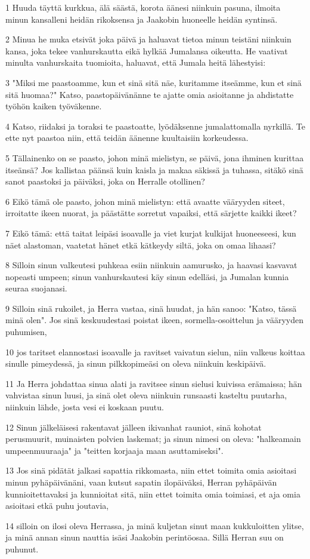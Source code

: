 \par 1 Huuda täyttä kurkkua, älä säästä, korota äänesi niinkuin pasuna, ilmoita minun kansalleni heidän rikoksensa ja Jaakobin huoneelle heidän syntinsä.
\par 2 Minua he muka etsivät joka päivä ja haluavat tietoa minun teistäni niinkuin kansa, joka tekee vanhurskautta eikä hylkää Jumalansa oikeutta. He vaativat minulta vanhurskaita tuomioita, haluavat, että Jumala heitä lähestyisi:
\par 3 "Miksi me paastoamme, kun et sinä sitä näe, kuritamme itseämme, kun et sinä sitä huomaa?" Katso, paastopäivänänne te ajatte omia asioitanne ja ahdistatte työhön kaiken työväkenne.
\par 4 Katso, riidaksi ja toraksi te paastoatte, lyödäksenne jumalattomalla nyrkillä. Te ette nyt paastoa niin, että teidän äänenne kuultaisiin korkeudessa.
\par 5 Tällainenko on se paasto, johon minä mielistyn, se päivä, jona ihminen kurittaa itseänsä? Jos kallistaa päänsä kuin kaisla ja makaa säkissä ja tuhassa, sitäkö sinä sanot paastoksi ja päiväksi, joka on Herralle otollinen?
\par 6 Eikö tämä ole paasto, johon minä mielistyn: että avaatte vääryyden siteet, irroitatte ikeen nuorat, ja päästätte sorretut vapaiksi, että särjette kaikki ikeet?
\par 7 Eikö tämä: että taitat leipäsi isoavalle ja viet kurjat kulkijat huoneeseesi, kun näet alastoman, vaatetat hänet etkä kätkeydy siltä, joka on omaa lihaasi?
\par 8 Silloin sinun valkeutesi puhkeaa esiin niinkuin aamurusko, ja haavasi kasvavat nopeasti umpeen; sinun vanhurskautesi käy sinun edelläsi, ja Jumalan kunnia seuraa suojanasi.
\par 9 Silloin sinä rukoilet, ja Herra vastaa, sinä huudat, ja hän sanoo: "Katso, tässä minä olen". Jos sinä keskuudestasi poistat ikeen, sormella-osoittelun ja vääryyden puhumisen,
\par 10 jos taritset elannostasi isoavalle ja ravitset vaivatun sielun, niin valkeus koittaa sinulle pimeydessä, ja sinun pilkkopimeäsi on oleva niinkuin keskipäivä.
\par 11 Ja Herra johdattaa sinua alati ja ravitsee sinun sielusi kuivissa erämaissa; hän vahvistaa sinun luusi, ja sinä olet oleva niinkuin runsaasti kasteltu puutarha, niinkuin lähde, josta vesi ei koskaan puutu.
\par 12 Sinun jälkeläisesi rakentavat jälleen ikivanhat rauniot, sinä kohotat perusmuurit, muinaisten polvien laskemat; ja sinun nimesi on oleva: "halkeamain umpeenmuuraaja" ja "teitten korjaaja maan asuttamiseksi".
\par 13 Jos sinä pidätät jalkasi sapattia rikkomasta, niin ettet toimita omia asioitasi minun pyhäpäivänäni, vaan kutsut sapatin ilopäiväksi, Herran pyhäpäivän kunnioitettavaksi ja kunnioitat sitä, niin ettet toimita omia toimiasi, et aja omia asioitasi etkä puhu joutavia,
\par 14 silloin on ilosi oleva Herrassa, ja minä kuljetan sinut maan kukkuloitten ylitse, ja minä annan sinun nauttia isäsi Jaakobin perintöosaa. Sillä Herran suu on puhunut.

